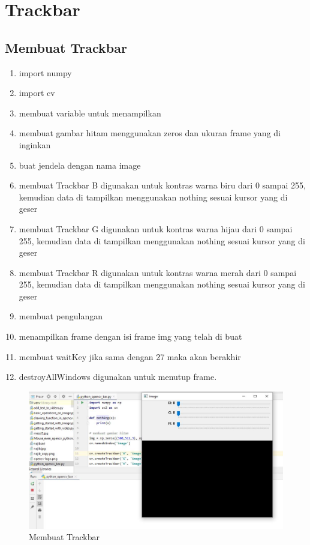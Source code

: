 \newpage
\section{Trackbar}
\subsection{Membuat Trackbar}

\begin{enumerate}
	\item import numpy
	\item import cv
	\item membuat variable untuk menampilkan
	\item membuat gambar hitam menggunakan zeros dan ukuran frame yang di inginkan
	\item buat jendela dengan nama image
	\item membuat Trackbar B digunakan untuk kontras warna biru dari 0 sampai 255, kemudian data di tampilkan menggunakan nothing sesuai kursor yang di geser
	\item membuat Trackbar G digunakan untuk kontras warna hijau dari 0 sampai 255, kemudian data di tampilkan menggunakan nothing sesuai kursor yang di geser
	\item membuat Trackbar R digunakan untuk kontras warna merah dari 0 sampai 255, kemudian data di tampilkan menggunakan nothing sesuai kursor yang di geser
	\item membuat pengulangan 
	\item menampilkan frame dengan isi frame img yang telah di buat
	\item membuat waitKey jika sama dengan 27 maka akan berakhir
	\item destroyAllWindows digunakan untuk menutup frame.
\end{enumerate}

\begin{figure}[ht]
\centering
\includegraphics[scale=0.45]{figures/2,30.jpg}
\caption{Membuat Trackbar}
\label{contoh}
\end{figure}


